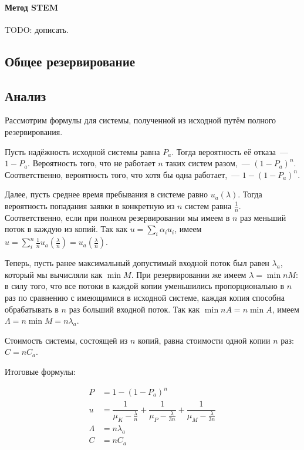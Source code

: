 \documentclass[12pt, a4paper] {ncc}
\begin{document}
\paragraph{Метод STEM} TODO: дописать.

\subsection*{Общее резервирование}

\subsection*{Анализ}

Рассмотрим формулы для системы, полученной из исходной путём полного
резервирования.

Пусть надёжность исходной системы равна $P_a$. Тогда вероятность её отказа~---
$1 - P_a$. Вероятность того, что не работает $n$ таких систем разом,~---
$(1 - P_a)^n$. Соответственно, вероятность того, что хотя бы одна работает,~---
$1 - (1 - P_a)^n$.

Далее, пусть среднее время пребывания в системе равно $u_a(\lambda)$. Тогда
вероятность попадания заявки в конкретную из $n$ систем равна $\frac 1 n$.
Соответственно, если при полном резервировании мы имеем в $n$ раз меньший поток
в каждую из копий. Так как $u = \sum_i \alpha_i u_i$, имеем $u = \sum_i^n
\frac{1}{n} u_a\left(\frac \lambda n\right) = u_a\left(\frac \lambda n\right)$.

Теперь, пусть ранее максимальный допустимый входной поток был равен $\lambda_a$,
который мы вычисляли как $\min M$. При резервировании же имеем $\lambda =
\min n M$: в силу того, что все потоки в каждой копии уменьшились
пропорционально в $n$ раз по сравнению с имеющимися в исходной системе, каждая
копия способна обрабатывать в $n$ раз больший входной поток. Так как $\min nA =
n \min A$, имеем $\Lambda = n \min M = n \lambda_a$.

Стоимость системы, состоящей из $n$ копий, равна стоимости одной копии $n$ раз:
$C = n C_a$.

Итоговые формулы:

$$\begin{aligned}
P &= 1 - (1 - P_a)^n \\
u &= \dfrac{1} {\mu_K - \frac \lambda n} +
     \dfrac{1} {\mu_P - \frac \lambda {3n}} +
     \dfrac{1} {\mu_M - \frac \lambda {3n}} \\
\Lambda &= n\lambda_a \\
C       &= n C_a
\end{aligned}$$
\end{document}
